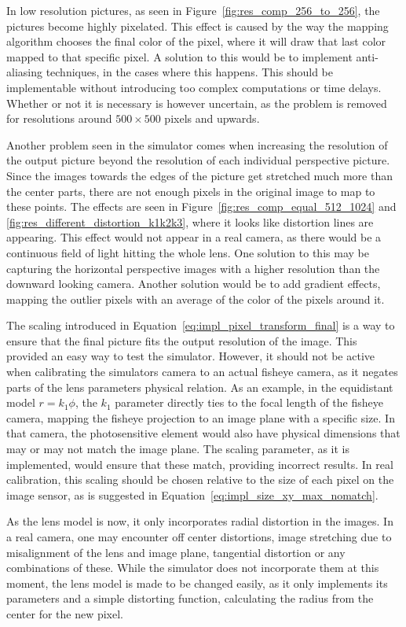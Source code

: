 In low resolution pictures, as seen in Figure~\ref{fig:res_comp_256_to_256}, the pictures become highly pixelated. This effect is caused by the way the mapping algorithm chooses the final color of the pixel, where it will draw that last color mapped to that specific pixel. A solution to this would be to implement anti-aliasing techniques, in the cases where this happens. This should be implementable without introducing too complex computations or time delays. Whether or not it is necessary is however uncertain, as the problem is removed for resolutions around $500\times 500$ pixels and upwards.

Another problem seen in the simulator comes when increasing the resolution of the output picture beyond the resolution of each individual perspective picture. Since the images towards the edges of the picture get stretched much more than the center parts, there are not enough pixels in the original image to map to these points. The effects are seen in Figure~\ref{fig:res_comp_equal_512_1024} and \ref{fig:res_different_distortion_k1k2k3}, where it looks like distortion lines are appearing. This effect would not appear in a real camera, as there would be a continuous field of light hitting the whole lens. One solution to this may be capturing the horizontal perspective images with a higher resolution than the downward looking camera. Another solution would be to add gradient effects, mapping the outlier pixels with an average of the color of the pixels around it. 

The scaling introduced in Equation~\eqref{eq:impl_pixel_transform_final} is a way to ensure that the final picture fits the output resolution of the image. This provided an easy way to test the simulator. However, it should not be active when calibrating the simulators camera to an actual fisheye camera, as it negates parts of the lens parameters physical relation. As an example, in the equidistant model $r=k_1 \phi$, the $k_1$ parameter directly ties to the focal length of the fisheye camera, mapping the fisheye projection to an image plane with a specific size. In that camera, the photosensitive element would also have physical dimensions that may or may not match the image plane. The scaling parameter, as it is implemented, would ensure that these match, providing incorrect results. In real calibration, this scaling should be chosen relative to the size of each pixel on the image sensor, as is suggested in Equation~\eqref{eq:impl_size_xy_max_nomatch}.

As the lens model is now, it only incorporates radial distortion in the images. In a real camera, one may encounter off center distortions, image stretching due to misalignment of the lens and image plane, tangential distortion or any combinations of these. While the simulator does not incorporate them at this moment, the lens model is made to be changed easily, as it only implements its parameters and a simple distorting function, calculating the radius from the center for the new pixel.

